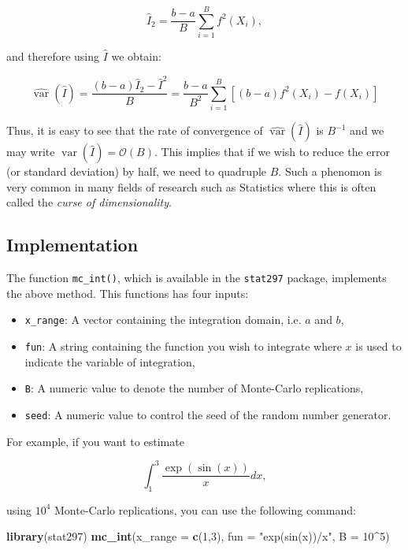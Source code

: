 \documentclass[12pt,]{krantz}
\newenvironment{Shaded}{\begin{snugshade}}{\end{snugshade}}
\newcommand{\KeywordTok}[1]{\textcolor[rgb]{0.27,0.27,0.27}{\textbf{#1}}}
\newcommand{\DataTypeTok}[1]{\textcolor[rgb]{0.27,0.27,0.27}{#1}}
\newcommand{\DecValTok}[1]{\textcolor[rgb]{0.06,0.06,0.06}{#1}}
\newcommand{\StringTok}[1]{\textcolor[rgb]{0.5,0.5,0.5}{#1}}
\newcommand{\OperatorTok}[1]{\textcolor[rgb]{0.43,0.43,0.43}{\textbf{#1}}}
\newcommand{\NormalTok}[1]{#1}
\providecommand{\tightlist}{%
  \setlength{\itemsep}{0pt}\setlength{\parskip}{0pt}}
\begin{document}
\[
\hat{I}_2 = \frac{b - a}{B} \sum_{i = 1}^B f^2(X_i),
\]

and therefore using \(\hat{I}\) we obtain:

\[
\widehat{\operatorname{var}} \left(\hat{I} \right) = \frac{(b-a) \hat{I}_2 - \hat{I}^2}{B} = \frac{b - a}{B^2} \sum_{i = 1}^B\left[ (b - a )f^2(X_i) - f(X_i)\right]
\]

Thus, it is easy to see that the rate of convergence of
\(\widehat{\operatorname{var}} \left(\hat{I} \right)\) is \(B^{-1}\) and
we may write
\({\operatorname{var}} \left(\hat{I} \right) = \mathcal{O}(B)\). This
implies that if we wish to reduce the error (or standard deviation) by
half, we need to quadruple \(B\). Such a phenomon is very common in many
fields of research such as Statistics where this is often called the
\emph{curse of dimensionality}.

\newline

\subsection{Implementation}\label{implementation}

The function \texttt{mc\_int()}, which is available in the
\texttt{stat297} package, implements the above method. This functions
has four inputs:

\begin{itemize}
\tightlist
\item
  \texttt{x\_range}: A vector containing the integration domain, i.e.
  \(a\) and \(b\),
\item
  \texttt{fun}: A string containing the function you wish to integrate
  where \(x\) is used to indicate the variable of integration,
\item
  \texttt{B}: A numeric value to denote the number of Monte-Carlo
  replications,
\item
  \texttt{seed}: A numeric value to control the seed of the random
  number generator.
\end{itemize}

For example, if you want to estimate

\[
\int_1^3 \frac{\exp\left(\sin(x)\right)}{x} dx,
\]

using \(10^4\) Monte-Carlo replications, you can use the following
command:

\begin{Shaded}
\begin{Highlighting}[]
\KeywordTok{library}\NormalTok{(stat297)}
\KeywordTok{mc_int}\NormalTok{(}\DataTypeTok{x_range =} \KeywordTok{c}\NormalTok{(}\DecValTok{1}\NormalTok{,}\DecValTok{3}\NormalTok{), }\DataTypeTok{fun =} \StringTok{"exp(sin(x))/x"}\NormalTok{, }\DataTypeTok{B =} \DecValTok{10}\OperatorTok{^}\DecValTok{5}\NormalTok{)}
\end{Highlighting}
\end{Shaded}
\end{document}
